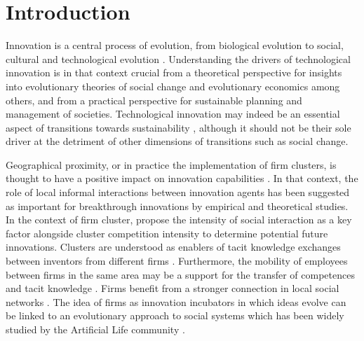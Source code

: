 \documentclass[letterpaper]{article}
\begin{document}

\section{Introduction}

Innovation is a central process of evolution, from biological evolution to social, cultural \citep{mesoudi2018cumulative} and technological evolution \citep{sood2005technological}. Understanding the drivers of technological innovation is in that context crucial from a theoretical perspective for insights into evolutionary theories of social change and evolutionary economics among others, and from a practical perspective for sustainable planning and management of societies. Technological innovation may indeed be an essential aspect of transitions towards sustainability \citep{adams2016sustainability}, although it should not be their sole driver at the detriment of other dimensions of transitions such as social change.

Geographical proximity, or in practice the implementation of firm clusters, is thought to have a positive impact on innovation capabilities \citep{bittencourt2019cluster}. In that context, the role of local informal interactions between innovation agents has been suggested as important for breakthrough innovations by empirical and theoretical studies. In the context of firm cluster, \cite{gnyawali2013complementary} propose the intensity of social interaction as a key factor alongside cluster competition intensity to determine potential future innovations. Clusters are understood as enablers of tacit knowledge exchanges between inventors from different firms \citep{arikan2009interfirm}. Furthermore, the mobility of employees between firms in the same area may be a support for the transfer of competences and tacit knowledge \citep{almeida1999localization}. Firms benefit from a stronger connection in local social networks \citep{kemeny2016economic}. The idea of firms as innovation incubators in which ideas evolve can be linked to an evolutionary approach to social systems which has been widely studied by the Artificial Life community \citep{marriott2018social}.
\end{document}
